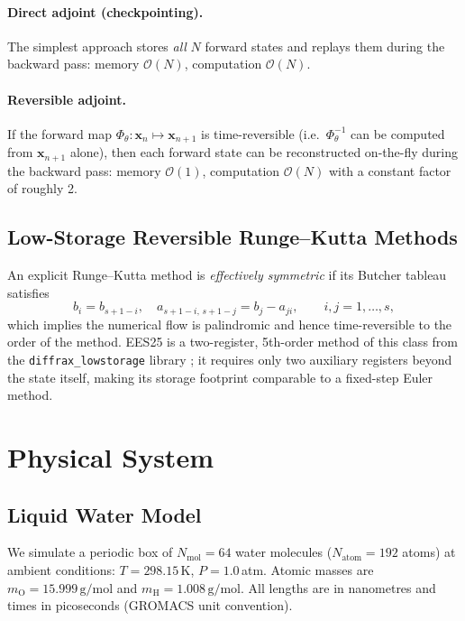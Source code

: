 \documentclass{article}
\newcommand{\EES}{\textsc{EES25}}
\begin{document}
\paragraph{Direct adjoint (checkpointing).}
The simplest approach stores \emph{all} $N$ forward states and replays them
during the backward pass: memory $\mathcal{O}(N)$, computation $\mathcal{O}(N)$.

\paragraph{Reversible adjoint.}
If the forward map $\Phi_\theta : \bm{x}_n \mapsto \bm{x}_{n+1}$ is
time-reversible (i.e.\ $\Phi_\theta^{-1}$ can be computed from $\bm{x}_{n+1}$
alone), then each forward state can be reconstructed on-the-fly during the
backward pass: memory $\mathcal{O}(1)$, computation $\mathcal{O}(N)$ with a
constant factor of roughly 2.

\subsection{Low-Storage Reversible Runge--Kutta Methods}
\label{sec:ees_background}

An explicit Runge--Kutta method is \emph{effectively symmetric} if its
Butcher tableau satisfies
\begin{equation}
  b_i = b_{s+1-i}, \quad
  a_{s+1-i,\,s+1-j} = b_j - a_{ji},
  \qquad i,j = 1,\ldots,s,
\end{equation}
which implies the numerical flow is palindromic and hence time-reversible
to the order of the method.  \EES{} is a two-register, 5th-order method of
this class from the \texttt{diffrax\_lowstorage} library
\cite{diffrax_lowstorage}; it requires only two auxiliary registers beyond
the state itself, making its storage footprint comparable to a fixed-step
Euler method.

\section{Physical System}
\label{sec:system}

\subsection{Liquid Water Model}

We simulate a periodic box of $N_\mathrm{mol} = 64$ water molecules
($N_\mathrm{atom} = 192$ atoms) at ambient conditions: $T = 298.15$\,K,
$P = 1.0$\,atm.  Atomic masses are $m_\mathrm{O} = 15.999\,\mathrm{g/mol}$
and $m_\mathrm{H} = 1.008\,\mathrm{g/mol}$.  All lengths are in nanometres
and times in picoseconds (GROMACS unit convention).
\end{document}
